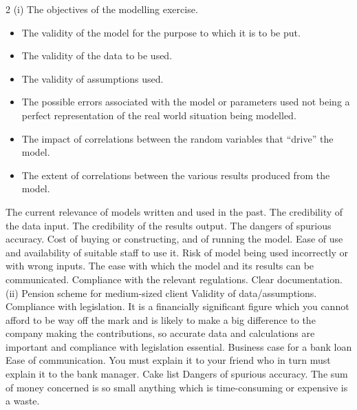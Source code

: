 \documentclass[a4paper,12pt]{article}
\begin{document}
2 (i) The objectives of the modelling exercise.
\begin{itemize}
    \item The validity of the model for the purpose to which it is to be put.
    \item The validity of the data to be used.
    \item The validity of assumptions used.
    \item The possible errors associated with the model or parameters used not being a perfect representation of the real world situation being modelled.
    \item The impact of correlations between the random variables that “drive” the model.
    \item The extent of correlations between the various results produced from the
model.
\end{itemize}

The current relevance of models written and used in the past.
The credibility of the data input.
The credibility of the results output.
The dangers of spurious accuracy.
Cost of buying or constructing, and of running the model.
Ease of use and availability of suitable staff to use it.
Risk of model being used incorrectly or with wrong inputs.
The ease with which the model and its results can be communicated.
Compliance with the relevant regulations.
Clear documentation. 
(ii) Pension scheme for medium-sized client
Validity of data/assumptions. Compliance with legislation.
It is a financially significant figure which you cannot afford to be way off the mark and is likely to make a big difference to the company making the contributions, so accurate data and calculations are important and compliance with legislation essential.
Business case for a bank loan
Ease of communication.
You must explain it to your friend who in turn must explain it to the bank manager.
Cake list
Dangers of spurious accuracy.
The sum of money concerned is so small anything which is time-consuming or expensive is a waste. 
\end{document}
